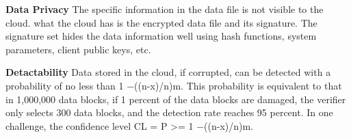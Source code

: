 \textbf{Data Privacy}
The specific information in the data file is not visible to the cloud. what the cloud has is the encrypted data file and its signature.
The signature set hides the data information well using hash functions, system parameters, client public keys, etc.

\textbf{Detactability}
Data stored in the cloud, if corrupted, can be detected with a probability of no less than 1 −((n-x)/n)m.
This probability is equivalent to that in 1,000,000 data blocks, if 1 percent of the data blocks are damaged, the verifier only selects 300 data blocks, and the detection rate reaches 95 percent. In one challenge, the confidence level CL = P >= 1 −((n-x)/n)m.






